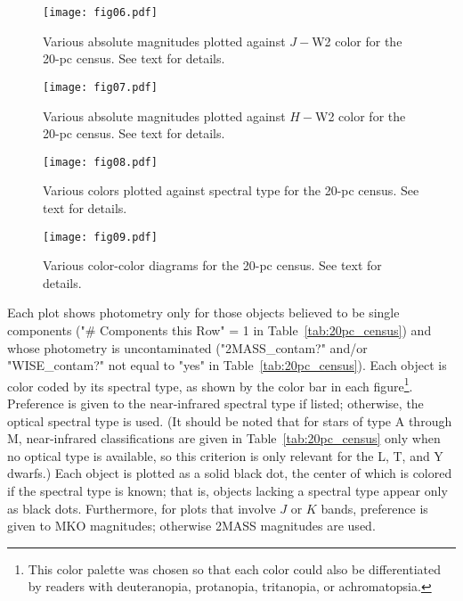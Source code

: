 \documentclass[twocolumn,tighten,twocolappendix]{aastex631}
\begin{document}
\begin{figure*}
\texttt{[image: fig06.pdf]}
\caption{Various absolute magnitudes plotted against $J-$W2 color for the 20-pc census. See text for details.
\label{fig:AbsMag_JW2}}
\end{figure*}

\begin{figure*}
\texttt{[image: fig07.pdf]}
\caption{Various absolute magnitudes plotted against $H-$W2 color for the 20-pc census. See text for details.
\label{fig:AbsMag_HW2}}
\end{figure*}

\begin{figure*}
\texttt{[image: fig08.pdf]}
\caption{Various colors plotted against spectral type for the 20-pc census. See text for details.
\label{fig:colors_SpType}}
\end{figure*}

\begin{figure*}
\texttt{[image: fig09.pdf]}
\caption{Various color-color diagrams for the 20-pc census. See text for details.
\label{fig:color_color}}
\end{figure*}

Each plot shows photometry only for those objects believed to be single components ("\# Components this Row" = 1 in Table~\ref{tab:20pc_census}) and whose photometry is uncontaminated ("2MASS\_contam?" and/or "WISE\_contam?" not equal to "yes" in Table~\ref{tab:20pc_census}). Each object is color coded by its spectral type, as shown by the color bar in each figure\footnote{This color palette was chosen so that each color could also be differentiated by readers with deuteranopia, protanopia, tritanopia, or achromatopsia.}. Preference is given to the near-infrared spectral type if listed; otherwise, the optical spectral type is used. (It should be noted that for stars of type A through M, near-infrared classifications are given in Table~\ref{tab:20pc_census} only when no optical type is available, so this criterion is only relevant for the L, T, and Y dwarfs.) Each object is plotted as a solid black dot, the center of which is colored if the spectral type is known; that is, objects lacking a spectral type appear only as black dots. Furthermore, for plots that involve $J$ or $K$ bands, preference is given to MKO magnitudes; otherwise 2MASS magnitudes are used.
\end{document}
